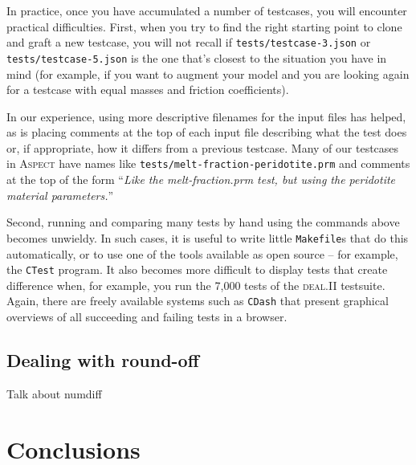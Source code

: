 \documentclass{article}
\newcommand{\dealii}{{\textsc{deal.II}}}
\newcommand{\aspect}{\textsc{Aspect}}
\begin{document}
In practice, once you have accumulated a number of testcases, you will
encounter practical difficulties. First, when you try to find the right
starting point to clone and graft a new testcase, you will not recall if
\texttt{tests/testcase-3.json} or \texttt{tests/testcase-5.json} is the one
that's closest to the situation you have in mind (for example, if you want to
augment your model and you are looking again for a testcase with equal masses
and friction coefficients). 

In our experience, using more descriptive filenames for the input files has
helped, as is placing comments at the top of each input file describing what
the test does or, if appropriate, how it differs from a previous
testcase. Many of our testcases in \aspect{} have names like
\texttt{tests/melt-fraction-peridotite.prm} and comments at the top of the
form ``\textit{Like the melt-fraction.prm test, but using the peridotite
  material parameters.}''

Second, running and
comparing many tests by hand using the commands above becomes unwieldy. In such
cases, it is useful to write little \texttt{Makefile}s that do this
automatically, or to use one of the tools available as open source -- for
example, the \texttt{CTest} program. It also
becomes more difficult to display tests that create difference when, for
example, you run the 7,000 tests of the \dealii{} testsuite. Again, there are
freely available systems such as \texttt{CDash} that present graphical
overviews of all succeeding and failing tests in a browser.


\subsection{Dealing with round-off}

Talk about numdiff


\section{Conclusions}
\end{document}
